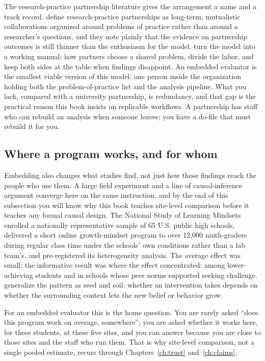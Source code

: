 The research-practice partnership literature gives the arrangement a name and a track record. \textcite{coburn2016partnerships} define research-practice partnerships as long-term, mutualistic collaborations organized around problems of practice rather than around a researcher's questions, and they note plainly that the evidence on partnership outcomes is still thinner than the enthusiasm for the model. \textcite{penuel2017creating} turn the model into a working manual: how partners choose a shared problem, divide the labor, and keep both sides at the table when findings disappoint. An embedded evaluator is the smallest viable version of this model: one person inside the organization holding both the problem-of-practice list and the analysis pipeline. What you lack, compared with a university partnership, is redundancy, and that gap is the practical reason this book insists on replicable workflows. A partnership has staff who can rebuild an analysis when someone leaves; you have a do-file that must rebuild it for you.

\subsection{Where a program works, and for whom}\label{sec:ch01-home-question}
Embedding also changes what studies find, not just how those findings reach the people who use them. A large field experiment and a line of causal-inference argument converge here on the same instruction, and by the end of this subsection you will know why this book teaches site-level comparison before it teaches any formal causal design. The National Study of Learning Mindsets \parencite{yeager2019mindset} enrolled a nationally representative sample of 65 U.S. public high schools, delivered a short online growth-mindset program to over 12,000 ninth-graders during regular class time under the schools' own conditions rather than a lab team's, and pre-registered its heterogeneity analysis. The average effect was small; the informative result was where the effect concentrated: among lower-achieving students and in schools whose peer norms supported seeking challenge. \textcite{walton2020seed} generalize the pattern as seed and soil: whether an intervention takes depends on whether the surrounding context lets the new belief or behavior grow.

For an embedded evaluator this is the home question. You are rarely asked \enquote{does this program work on average, somewhere}; you are asked whether it works here, for these students, at these five sites, and you can answer because you are close to those sites and the staff who run them. That is why site-level comparison, not a single pooled estimate, recurs through Chapters~\ref{ch:trust} and~\ref{ch:claims}.

